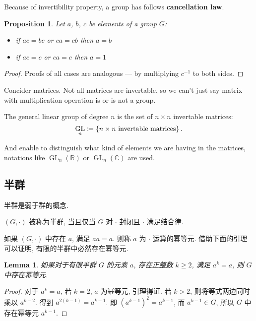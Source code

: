 \documentclass[UTF8]{ctexart}
\theoremstyle{mystyle}
\newtheorem{lemma}{Lemma}[section]
\newtheorem{proposition}{Proposition}[section]
\theoremstyle{myremark}
\theoremstyle{plain}
\newcommand{\R}{\mathbb R}
\newcommand{\C}{\mathbb C}
\DeclareMathOperator{\GL}{GL}
\DeclarePairedDelimiter\set{\{}{\}}
\begin{document}
Because of invertibility property, a group has follows \textbf{cancellation law}.

\begin{proposition}
    Let $ a $, $ b $, $ c $ be elements of a group $ G $: 
    \begin{itemize}
        \item if $ ac = bc $ or $ ca = cb $ then $ a = b $
        \item if $ ac = c $ or $ ca = c $ then $ a = 1 $
    \end{itemize}
\end{proposition}

\begin{proof}
    Proofs of all cases are analogous --- by multiplying $ c^{-1} $ to both sides.
\end{proof}

Concider matrices. Not all matrices are invertable, so we can't just say matrix with multiplication operation is or is not a group.

\begin{definition}
    The general linear group of degree $ n $ is the set of $ n \times n $ invertable matrices:
    \[ \GL_n \coloneqq \set{n \times n \text{ invertable matrices}} \,.\]

    And enable to distinguish what kind of elements we are having in the matrices, notations like $ \GL_n(\R) $ or $ \GL_n(\C) $ are used.
\end{definition}

\subsection{半群}
半群是弱于群的概念.
\begin{definition}[\text{半群}]
    $ (G, \cdot) $ 被称为半群, 当且仅当 $ G $ 对 $ \cdot $ 封闭且 $ \cdot $ 满足结合律.
\end{definition}

如果 $ (G, \cdot) $ 中存在 $ a $, 满足 $ a a = a $. 则称 $ a $ 为 $ \cdot $ 运算的幂等元. 借助下面的引理可以证明, 有限的半群中必然存在幂等元.

\begin{lemma}
    如果对于有限半群 $ G $ 的元素 $ a $, 存在正整数 $ k \geqslant 2 $, 满足 $ a^k = a $, 则 $ G $ 中存在幂等元.
\end{lemma}

\begin{proof}
    对于 $ a^k = a $, 若 $ k = 2 $, $ a $ 为幂等元, 引理得证. 若 $ k > 2 $, 则将等式两边同时乘以 $ a^{k - 2} $. 得到 $ a^{2(k - 1)} = a^{k - 1} $. 即 $ \left( a^{k - 1} \right)^2 = a^{k - 1} $, 而 $ a^{k - 1} \in G $, 所以 $ G $ 中存在幂等元 $ a^{k - 1} $.
\end{proof}
\end{document}
